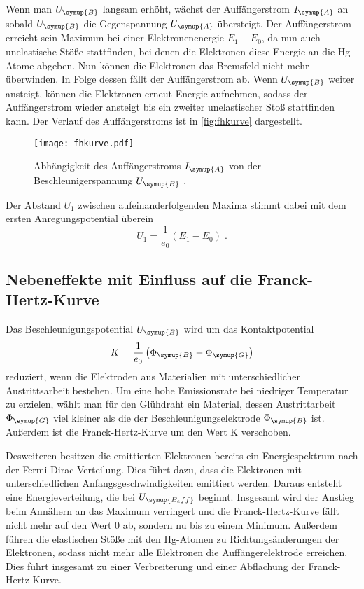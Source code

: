 Wenn man $U_{\symup{B}}$ langsam erhöht, wächst der Auffängerstrom $I_{\symup{A}}$ an sobald $U_{\symup{B}}$ die Gegenspannung $U_{\symup{A}}$ 
übersteigt. Der Auffängerstrom erreicht sein Maximum bei einer Elektronenenergie $E_1 - E_0$, da nun auch unelastische Stöße stattfinden, bei denen
die Elektronen diese Energie an die Hg-Atome abgeben. Nun können die Elektronen das Bremsfeld nicht mehr überwinden. In Folge dessen fällt der 
Auffängerstrom ab. Wenn $U_{\symup{B}}$ weiter ansteigt, können die Elektronen erneut Energie aufnehmen, sodass der Auffängerstrom wieder ansteigt 
bis ein zweiter unelastischer Stoß stattfinden kann. Der Verlauf des Auffängerstroms ist in \autoref{fig:fhkurve} dargestellt. 
\begin{figure}
    \centering
    \texttt{[image: fhkurve.pdf]}
    \caption{Abhängigkeit des Auffängerstroms $I_{\symup{A}}$ von der Beschleunigerspannung $U_{\symup{B}}$ \cite{ap601}.}
    \label{fig:fhkurve}
\end{figure}

Der Abstand $U_1$ zwischen aufeinanderfolgenden Maxima stimmt dabei mit dem ersten Anregungspotential überein
\begin{equation*}
    U_1 = \frac{1}{e_0}\left(E_1 - E_0\right) \; .
\end{equation*}

\subsection{Nebeneffekte mit Einfluss auf die Franck-Hertz-Kurve}
Das Beschleunigungspotential $U_{\symup{B}}$ wird um das Kontaktpotential 
\begin{equation*}
    K = \frac{1}{e_0} \left(\Phi_{\symup{B}}-\Phi_{\symup{G}}\right)
\end{equation*}
reduziert, wenn die Elektroden aus Materialien mit unterschiedlicher Austrittsarbeit bestehen. Um eine hohe Emissionsrate bei niedriger Temperatur zu 
erzielen, wählt man für den Glühdraht ein Material, dessen Austrittarbeit $\Phi_{\symup{G}}$ viel kleiner als die der Beschleunigungselektrode 
$\Phi_{\symup{B}}$ ist.
Außerdem ist die Franck-Hertz-Kurve um den Wert K verschoben.

Desweiteren besitzen die emittierten Elektronen bereits ein Energiespektrum nach der Fermi-Dirac-Verteilung. Dies führt dazu, dass die Elektronen 
mit unterschiedlichen Anfangsgeschwindigkeiten emittiert werden. Daraus entsteht eine Energieverteilung, die bei $U_{\symup{B_eff}}$ beginnt.
Insgesamt wird der Anstieg beim Annähern an das Maximum verringert und die Franck-Hertz-Kurve fällt nicht mehr auf den Wert 0 ab, sondern nu bis 
zu einem Minimum. 
Außerdem führen die elastischen Stöße mit den Hg-Atomen zu Richtungsänderungen der Elektronen, sodass nicht mehr alle Elektronen die Auffängerelektrode 
erreichen. Dies führt insgesamt zu einer Verbreiterung und einer Abflachung der Franck-Hertz-Kurve.

